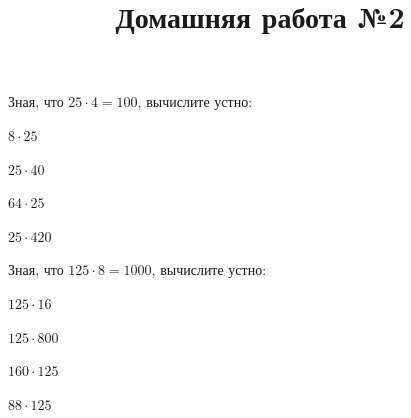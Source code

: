 \begin{listofex}
	\item Зная, что \( 25\cdot4=100 \), вычислите устно:
	\begin{enumcols}[itemcolumns=4]
		\item \( 8\cdot25 \)
		\item \( 25\cdot40 \)
		\item \( 64\cdot25 \)
		\item \( 25\cdot420 \)
	\end{enumcols}
	\item Зная, что \( 125\cdot8=1000 \), вычислите устно:
	\begin{enumcols}[itemcolumns=4]
		\item \( 125\cdot16 \)
		\item \( 125\cdot800 \)
		\item \( 160\cdot125 \)
		\item \( 88\cdot125 \)
	\end{enumcols}
\end{listofex}
\newpage
\title{Домашняя работа №2}

